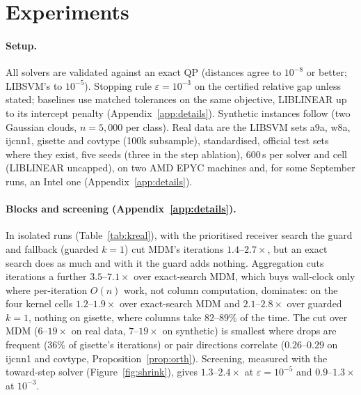 \documentclass{opt2026}   %
\begin{document}
\section{Experiments}\label{sec:exp}

\paragraph{Setup.} All solvers are validated against an exact
QP (distances agree to $10^{-8}$ or better; LIBSVM's to $10^{-5}$). Stopping rule
$\varepsilon=10^{-3}$ on the certified relative gap unless stated;
baselines use matched tolerances on the same objective, LIBLINEAR up
to its intercept penalty (Appendix~\ref{app:details}). Synthetic instances follow
\cite{gupta2026} (two Gaussian clouds, $n=5{,}000$ per class). Real data
are the LIBSVM sets a9a, w8a, ijcnn1, gisette and covtype (100k
subsample), standardised, official test sets where they exist, five
seeds (three in the step ablation), 600\,s per solver and cell (LIBLINEAR
\cite{fan2008} uncapped), on two AMD EPYC machines and, for some September runs, an Intel one
(Appendix~\ref{app:details}).


\paragraph{Blocks and screening (Appendix~\ref{app:details}).} In
isolated runs (Table~\ref{tab:kreal}), with the prioritised receiver
search the guard and fallback (guarded $k{=}1$) cut MDM's iterations
$1.4$--$2.7\times$, but an exact search does as much and with it the
guard adds nothing. Aggregation cuts iterations a further
$3.5$--$7.1\times$ over exact-search MDM, which buys wall-clock only where
per-iteration $O(n)$ work, not column computation, dominates: on the
four kernel cells $1.2$--$1.9\times$ over exact-search MDM and
$2.1$--$2.8\times$ over guarded $k{=}1$, nothing on gisette, where
columns take $82$--$89\%$ of the time. The cut over MDM ($6$--$19\times$
on real data, $7$--$19\times$ on synthetic) is smallest where drops are
frequent ($36\%$ of gisette's iterations) or pair directions correlate
($0.26$--$0.29$ on ijcnn1 and covtype, Proposition~\ref{prop:orth}). Screening,
measured with the toward-step solver (Figure~\ref{fig:shrink}), gives
$1.3$--$2.4\times$ at $\varepsilon=10^{-5}$ and $0.9$--$1.3\times$ at
$10^{-3}$.
\end{document}
